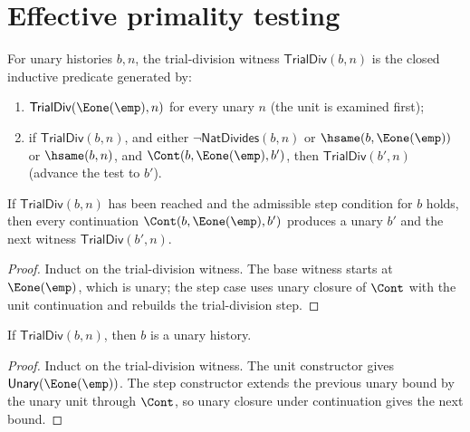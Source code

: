 \section{Effective primality testing}

\begin{definition}
\label{def:trial-division-witness}
For unary histories \(b, n\), the trial-division witness \(\mathsf{TrialDiv}(b, n)\) is the closed inductive predicate generated by:
\begin{enumerate}
  \item \(\mathsf{TrialDiv}(\Eone(\emp), n)\) for every unary \(n\) (the unit is examined first);
  \item if \(\mathsf{TrialDiv}(b, n)\), and either \(\neg \mathsf{NatDivides}(b, n)\) or \(\hsame(b, \Eone(\emp))\) or \(\hsame(b, n)\), and \(\Cont(b, \Eone(\emp), b')\), then \(\mathsf{TrialDiv}(b', n)\) (advance the test to \(b'\)).
\end{enumerate}
\end{definition}

\begin{theorem}
\label{thm:trialdiv-step-unary-closed}
If \(\mathsf{TrialDiv}(b,n)\) has been reached and the admissible step
condition for \(b\) holds, then every continuation
\(\Cont(b,\Eone(\emp),b')\) produces a unary \(b'\) and the next witness
\(\mathsf{TrialDiv}(b',n)\).
\end{theorem}
\begin{proof}
Induct on the trial-division witness. The base witness starts at
\(\Eone(\emp)\), which is unary; the step case uses unary closure of
\(\Cont\) with the unit continuation and rebuilds the trial-division step.
\end{proof}

\begin{theorem}
\label{thm:trial-div-bound-unary}
If \(\mathsf{TrialDiv}(b,n)\), then \(b\) is a unary history.
\end{theorem}
\begin{proof}
Induct on the trial-division witness. The unit constructor gives \(\mathsf{Unary}(\Eone(\emp))\). The step constructor extends the previous unary bound by the unary unit through \(\Cont\), so unary closure under continuation gives the next bound.
\end{proof}

